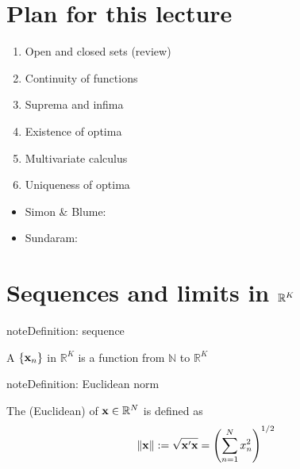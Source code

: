 \documentclass[letterpaper,10pt,english]{jupyterBook}
\begin{document}
\section{Plan for this lecture}
\label{\detokenize{06.optimization_fundamentals:plan-for-this-lecture}}\begin{enumerate}
%
\item {} 
\sphinxAtStartPar
Open and closed sets (review)

\item {} 
\sphinxAtStartPar
Continuity of functions

\item {} 
\sphinxAtStartPar
Suprema and infima

\item {} 
\sphinxAtStartPar
Existence of optima

\item {} 
\sphinxAtStartPar
Multivariate calculus

\item {} 
\sphinxAtStartPar
Uniqueness of optima

\end{enumerate}

\sphinxAtStartPar
{}
\begin{itemize}
\item {} 
\sphinxAtStartPar
Simon \& Blume:

\item {} 
\sphinxAtStartPar
Sundaram:

\end{itemize}


\section{Sequences and limits in \protect\(\mathbb{R}^K\protect\)}
\label{\detokenize{06.optimization_fundamentals:sequences-and-limits-in-mathbb-r-k}}
\begin{sphinxadmonition}{note}{Definition: sequence}

\sphinxAtStartPar
A  \(\{{\bf x}_n\}\) in \(\mathbb{R}^K\) is a function from \(\mathbb{N}\) to \(\mathbb{R}^K\)
\end{sphinxadmonition}

\begin{sphinxadmonition}{note}{Definition: Euclidean norm}

\sphinxAtStartPar
The (Euclidean)  of \({\bf x} \in \mathbb{R}^N\) is defined as
\begin{equation*}
\begin{split}
%
\| {\bf x} \| 
:= \sqrt{{\bf x}' {\bf x} } 
= \left( \sum_{n=1}^N x_n^2 \right)^{1/2}
%
\end{split}
\end{equation*}\end{sphinxadmonition}
\end{document}
